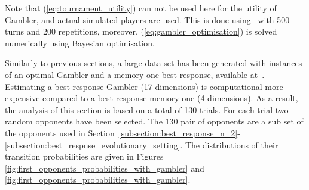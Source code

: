 \documentclass[10pt]{article}
\begin{document}
Note that (\ref{eq:tournament_utility}) can not be used here for the utility
of Gambler, and actual simulated players are used. This is done using~\cite{axelrodproject}
with 500 turns and 200 repetitions, moreover, (\ref{eq:gambler_optimisation})
is solved numerically using Bayesian optimisation.

Similarly to previous sections, a large data set has been generated with
instances of an optimal Gambler and a memory-one best response, available
at~\cite{glynatsi2019}. Estimating a best response Gambler (17 dimensions) is
computational more expensive compared to a best response memory-one (4
dimensions). As a result, the analysis of this section is based on a total of
130 trials. For each trial two random opponents have been selected. The 130 pair
of opponents are a sub set of the opponents used in
Section~\ref{subsection:best_response_n_2}-
\ref{subsection:best_respnse_evolutionary_setting}. The distributions of their
transition probabilities are given in Figures
\ref{fig:first_opponents_probabilities_with_gambler} and
\ref{fig:first_opponents_probabilities_with_gambler}.
\end{document}
